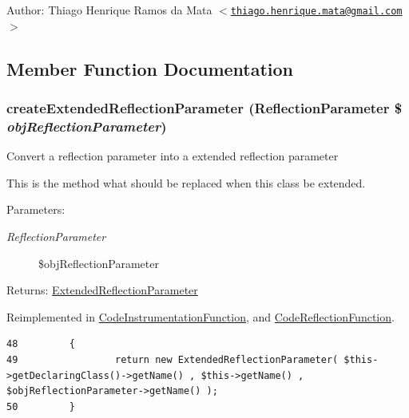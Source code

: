 \begin{Desc}
\item[Author:]Thiago Henrique Ramos da Mata $<$\href{mailto:thiago.henrique.mata@gmail.com}{\tt thiago.henrique.mata@gmail.com}$>$ \end{Desc}


\subsection{Member Function Documentation}
\hypertarget{class_extended_reflection_function_98ceb248f2b535a3a83ac2e7990e0c1f}{
\subsubsection[{createExtendedReflectionParameter}]{\setlength{\rightskip}{0pt plus 5cm}createExtendedReflectionParameter (ReflectionParameter \$ {\em objReflectionParameter})}}
\label{class_extended_reflection_function_98ceb248f2b535a3a83ac2e7990e0c1f}


Convert a reflection parameter into a extended reflection parameter

This is the method what should be replaced when this class be extended.

\begin{Desc}
\item[Parameters:]
\begin{description}
\item[{\em ReflectionParameter}]\$objReflectionParameter \end{description}
\end{Desc}
\begin{Desc}
\item[Returns:]\hyperlink{class_extended_reflection_parameter}{ExtendedReflectionParameter} \end{Desc}


Reimplemented in \hyperlink{class_code_instrumentation_function_98ceb248f2b535a3a83ac2e7990e0c1f}{CodeInstrumentationFunction}, and \hyperlink{class_code_reflection_function_98ceb248f2b535a3a83ac2e7990e0c1f}{CodeReflectionFunction}.

\begin{Code}\begin{verbatim}48         {
49                 return new ExtendedReflectionParameter( $this->getDeclaringClass()->getName() , $this->getName() , $objReflectionParameter->getName() );
50         }
\end{verbatim}
\end{Code}


